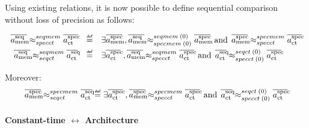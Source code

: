 \documentclass[12pt]{article}
\begin{document}
Using existing relations, it is now possible to define sequential comparison without loss of precision as follows:

\[
  \begin{array}{rcl}
    \seqmemTrace\seqmemTOspeccttr\specctTrace &\isdef& \exists \specmemTrace\;,
        \seqmemTrace\seqmemTOspecmemtr{0}{0}\specmemTrace
      \;\operatorname{and}\;
        \specmemTrace\specmemTOspeccttr\specctTrace
    \\[1ex]
    \seqmemTrace\seqmemTOseqcttr\seqctTrace &\isdef& \exists \specctTrace\;,
        \seqmemTrace\seqmemTOspeccttr\specctTrace
      \;\operatorname{and}\;
        \seqctTrace\seqctTOspeccttr{0}{0}\specctTrace
  \end{array}
\]

Moreover:
\[
  \specmemTrace\specmemTOseqcttr\seqctTrace \isdef 
    \exists \specctTrace\;,
      \specmemTrace\specmemTOspeccttr\specctTrace
    \;\operatorname{and}\;
      \seqctTrace\seqctTOspeccttr{0}{0}\specctTrace
\]

\paragraph{Constant-time $\leftrightarrow$ Architecture} $\;$
\end{document}
